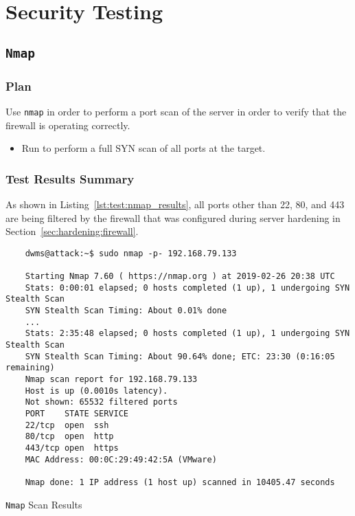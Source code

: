 \section{Security Testing}
\subsection{\texttt{Nmap}}
\subsubsection*{Plan}
Use \texttt{nmap} in order to perform a port scan of the server in order to verify that the firewall is operating correctly.
\begin{itemize}
  \item Run  to perform a full SYN scan of all ports at the target.
\end{itemize}

\subsubsection*{Test Results Summary}
As shown in Listing~\ref{lst:test:nmap_results}, all ports other than 22, 80, and 443 are being filtered by the firewall that was configured during server hardening in Section~\ref{sec:hardening:firewall}.
\begin{listing}[H]
  \captionsetup{skip=\skiplistingcaptionlen}
  \begin{verbatim}
    dwms@attack:~$ sudo nmap -p- 192.168.79.133

    Starting Nmap 7.60 ( https://nmap.org ) at 2019-02-26 20:38 UTC
    Stats: 0:00:01 elapsed; 0 hosts completed (1 up), 1 undergoing SYN Stealth Scan
    SYN Stealth Scan Timing: About 0.01% done
    ...
    Stats: 2:35:48 elapsed; 0 hosts completed (1 up), 1 undergoing SYN Stealth Scan
    SYN Stealth Scan Timing: About 90.64% done; ETC: 23:30 (0:16:05 remaining)
    Nmap scan report for 192.168.79.133
    Host is up (0.0010s latency).
    Not shown: 65532 filtered ports
    PORT    STATE SERVICE
    22/tcp  open  ssh
    80/tcp  open  http
    443/tcp open  https
    MAC Address: 00:0C:29:49:42:5A (VMware)

    Nmap done: 1 IP address (1 host up) scanned in 10405.47 seconds
  \end{verbatim}
  \caption{\texttt{Nmap} Scan Results}
  \label{lst:test:nmap_results}
\end{listing}

